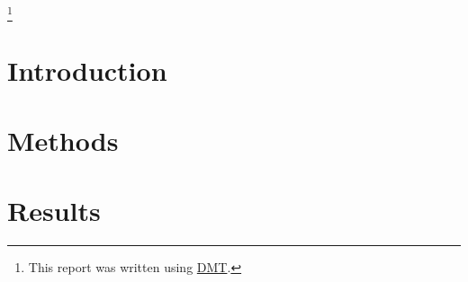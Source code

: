 \documentclass[12pt,a4paper]{article}
\begin{document}
 


\maketitle

\footnote{This report was written using
  \href{https://github.com/BlueBrain/DMT}{DMT}.}

\begin{abstract}
\end{abstract}

\section*{Introduction}


\newpage

\section*{Methods}


\newpage

\section*{Results}

\end{document}
